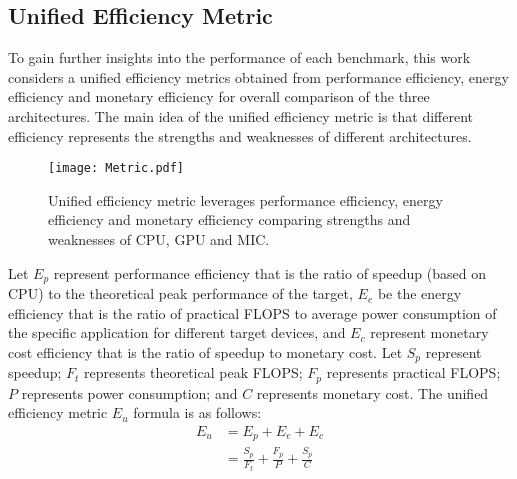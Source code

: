 \subsection{Unified Efficiency Metric}

To gain further insights into the performance of each benchmark, this work considers a unified efficiency metrics  obtained from performance efficiency, energy efficiency and monetary efficiency for overall comparison of the three architectures. The main idea of the unified efficiency metric is that different efficiency represents the strengths and weaknesses of different architectures.

    \begin{figure}[h!]
  \centering
  \begin{minipage}{0.5\textwidth}
    \centering
   \centering
     \texttt{[image: Metric.pdf]}    
  \caption{Unified efficiency metric leverages performance efficiency, energy efficiency and monetary efficiency comparing strengths and weaknesses of CPU, GPU and MIC.}
  \label{fig:metric}
\end{minipage}%
\end{figure}


Let $E_{p}$ represent performance efficiency that is the ratio of speedup (based on CPU) to the theoretical peak performance of the target, $E_{e}$ be the energy efficiency that is the ratio of practical FLOPS to average power consumption of the specific application for different target devices, and $E_{c}$ represent monetary cost efficiency that is the ratio of speedup to monetary cost. Let $S_{p}$ represent speedup; $F_{t}$ represents theoretical peak FLOPS; $F_{p}$ represents practical FLOPS; $P$ represents power consumption; and $C$ represents monetary cost. The unified efficiency metric $E_{u}$ formula is as follows:
  \begin{equation}\label{equ:metric1}
    \begin{split}
  {E_{u}} &  = E_{p}+E_{e}+E_{c} \\
   & = \frac{S_{p}}{F_{t}}+\frac{F_{p}}{P}+\frac{S_{p}}{C}
  \end{split}
\end{equation}
  
